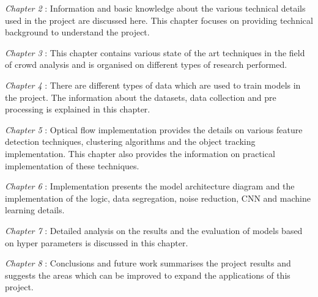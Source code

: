 \textit{Chapter 2} : Information and basic knowledge about the various technical details used in the project are discussed here. This chapter focuses on providing technical background to understand the project.

\textit{Chapter 3} : This chapter contains various state of the art techniques in the field of crowd analysis and is organised on different types of research performed.

 \textit{Chapter 4} : There are different types of data which are used to train models in the project. The information about the datasets, data collection and pre processing is explained in this chapter.
 
  \textit{Chapter 5} : Optical flow implementation provides the details on various feature detection techniques, clustering algorithms and the object tracking implementation. This chapter also provides the information on practical implementation of these techniques.
  
  \textit{Chapter 6} : Implementation presents the model architecture diagram and the implementation of the logic, data segregation, noise reduction, CNN and machine learning details.

  \textit{Chapter 7} : Detailed analysis on the results and the evaluation of models based on hyper parameters is discussed in this chapter.
  
    \textit{Chapter 8} : Conclusions and future work summarises the project results and suggests the areas which can be improved to expand the applications of this project.
  
  
 














